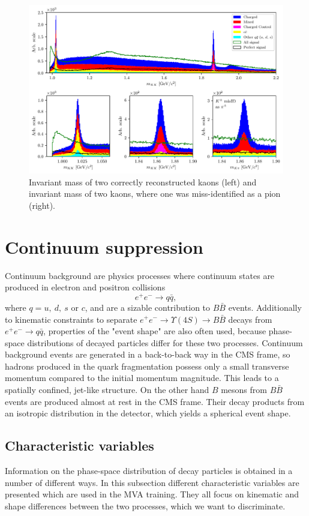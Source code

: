 \documentclass[headings=standardclasses,headings=big,oneside,a4paper,openany,12pt]{scrbook}
\begin{document}
\begin{figure}[H]
\centering
\captionsetup{width=0.8\linewidth}
\includegraphics[width=\linewidth]{fig/res_bkg}
\caption{Invariant mass of two correctly reconstructed kaons (left) and invariant mass of two kaons, where one was miss-identified as a pion (right).}
\label{fig:res_bkg}
\end{figure}


\section{Continuum suppression}

Continuum background are physics processes where continuum states are produced in electron and positron collisions $$e^+ e^- \to q \bar q,$$ 
where $q = u,~d,~s$ or $c$, and are a sizable contribution to $B \bar B$ events. Additionally to kinematic constraints to separate $e^+ e^- \to \Upsilon(4S) \to B \bar B$ decays from $e^+ e^- \to q \bar q$, properties of the "event shape" are also often used, because phase-space distributions of decayed particles differ for these two processes. Continuum background events are generated in a back-to-back way in the CMS frame, so hadrons produced in the quark fragmentation possess only a small transverse momentum compared to the initial momentum magnitude. This leads to a spatially confined, jet-like structure. On the other hand $B$ mesons from $B \bar B$ events are produced almost at rest in the CMS frame. Their decay products from an isotropic distribution in the detector, which yields a spherical event shape.

\subsection{Characteristic variables}
\label{ss:charvar}
Information on the phase-space distribution of decay particles is obtained in a number of different ways. In this subsection different characteristic variables are presented which are used in the MVA training. They all focus on kinematic and shape differences between the two processes, which we want to discriminate. 
\end{document}
